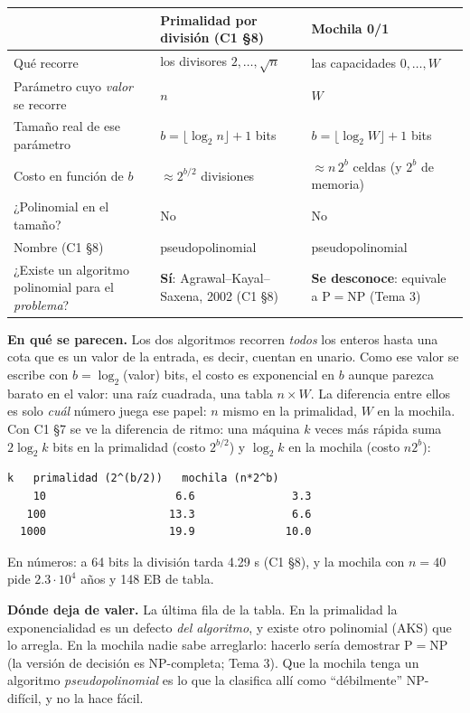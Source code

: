\documentclass[11pt]{article}
\begin{document}
\begin{center}\small
\begin{tabular}{@{}p{4.1cm}p{5.2cm}p{5.6cm}@{}}
\toprule
 & \textbf{Primalidad por división (C1 §8)} & \textbf{Mochila 0/1} \\
\midrule
Qué recorre & los divisores $2,\dots,\sqrt n$ & las capacidades $0,\dots,W$ \\
Parámetro cuyo \emph{valor} se recorre & $n$ & $W$ \\
Tamaño real de ese parámetro & $b=\lfloor\log_2n\rfloor+1$ bits & $b=\lfloor\log_2W\rfloor+1$ bits \\
Costo en función de $b$ & $\approx2^{b/2}$ divisiones & $\approx n\,2^{b}$ celdas (y $2^b$ de memoria) \\
¿Polinomial en el tamaño? & No & No \\
Nombre (C1 §8) & pseudopolinomial & pseudopolinomial \\
\midrule
¿Existe un algoritmo polinomial para el \emph{problema}? & \textbf{Sí}: Agrawal--Kayal--Saxena, 2002 (C1 §8) & \textbf{Se desconoce}: equivale a $\mathrm{P}=\mathrm{NP}$ (Tema 3) \\
\bottomrule
\end{tabular}
\end{center}

\textbf{En qué se parecen.} Los dos algoritmos recorren \emph{todos} los enteros hasta una cota que es un valor
de la entrada, es decir, cuentan en unario. Como ese valor se escribe con $b=\log_2$(valor) bits, el costo es
exponencial en $b$ aunque parezca barato en el valor: una raíz cuadrada, una tabla $n\times W$. La diferencia
entre ellos es solo \emph{cuál} número juega ese papel: $n$ mismo en la primalidad, $W$ en la mochila. Con
C1 §7 se ve la diferencia de ritmo: una máquina $k$ veces más rápida suma $2\log_2k$ bits en la primalidad
(costo $2^{b/2}$) y $\log_2k$ en la mochila (costo $n2^b$):
\begin{lstlisting}[style=salida,basicstyle=\ttfamily\footnotesize\color{black},columns=fixed]
     k   primalidad (2^(b/2))   mochila (n*2^b)
    10                    6.6               3.3
   100                   13.3               6.6
  1000                   19.9              10.0
\end{lstlisting}
En números: a 64 bits la división tarda 4.29 s (C1 §8), y la mochila con $n=40$ pide $2.3\cdot10^4$ años y 148
EB de tabla.

\textbf{Dónde deja de valer.} La última fila de la tabla. En la primalidad la exponencialidad es un defecto
\emph{del algoritmo}, y existe otro polinomial (AKS) que lo arregla. En la mochila nadie sabe arreglarlo:
hacerlo sería demostrar $\mathrm{P}=\mathrm{NP}$ (la versión de decisión es NP-completa; Tema 3). Que la mochila
tenga un algoritmo \emph{pseudopolinomial} es lo que la clasifica allí como ``débilmente'' NP-difícil, y no la
hace fácil.
\end{document}
